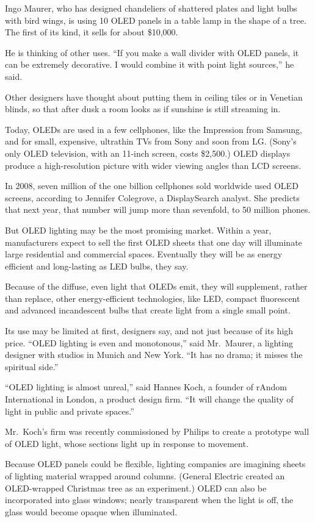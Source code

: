 ﻿\documentclass[12pt]{article}
\begin{document}
Ingo Maurer, who has designed chandeliers of shattered plates and light bulbs with bird wings, is
using 10 OLED panels in a table lamp in the shape of a tree. The first of its kind, it sells for
about \$10,000.

He is thinking of other uses. ``If you make a wall divider with OLED panels, it can be extremely
decorative. I would combine it with point light sources,'' he said.

Other designers have thought about putting them in ceiling tiles or in Venetian blinds, so that
after dusk a room looks as if sunshine is still streaming in.

Today, OLEDs are used in a few cellphones, like the Impression from Samsung, and for small,
expensive, ultrathin TVs from Sony and soon from LG. (Sony's only OLED television, with an 11-inch
screen, costs \$2,500.) OLED displays produce a high-resolution picture with wider viewing angles
than LCD screens.

In 2008, seven million of the one billion cellphones sold worldwide used OLED screens, according to
Jennifer Colegrove, a DisplaySearch analyst. She predicts that next year, that number will jump more
than sevenfold, to 50 million phones.

But OLED lighting may be the most promising market. Within a year, manufacturers expect to sell the
first OLED sheets that one day will illuminate large residential and commercial spaces. Eventually
they will be as energy efficient and long-lasting as LED bulbs, they say.

Because of the diffuse, even light that OLEDs emit, they will supplement, rather than replace, other
energy-efficient technologies, like LED, compact fluorescent and advanced incandescent bulbs that
create light from a single small point.

Its use may be limited at first, designers say, and not just because of its high price. ``OLED
lighting is even and monotonous,'' said Mr.~Maurer, a lighting designer with studios in Munich and
New York. ``It has no drama; it misses the spiritual side.''

``OLED lighting is almost unreal,'' said Hannes Koch, a founder of rAndom International in London, a
product design firm. ``It will change the quality of light in public and private spaces.''

Mr.~Koch's firm was recently commissioned by Philips to create a prototype wall of OLED light, whose
sections light up in response to movement.

Because OLED panels could be flexible, lighting companies are imagining sheets of lighting material
wrapped around columns. (General Electric created an OLED-wrapped Christmas tree as an experiment.)
OLED can also be incorporated into glass windows; nearly transparent when the light is off, the
glass would become opaque when illuminated.
\end{document}
